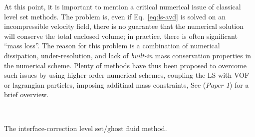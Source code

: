 At this point, it is important to mention a critical numerical issue of classical level set methods. The problem is, even if Eq.\ \eqref{eq:ls-avd} is solved on an incompressible velocity field, there is no guarantee that the numerical solution will conserve the total enclosed volume; in practice, there is often significant ``mass loss''.
The reason for this problem is a combination of numerical dissipation, under-resolution, and lack of \emph{built-in} mass conservation properties in the numerical scheme.
Plenty of methods have thus been proposed to overcome such issues by using higher-order numerical schemes, coupling the LS with VOF or lagrangian particles, imposing additinal mass constraints, \etc See \cite{ICLS} (\emph{Paper 1}) for a brief overview.

\begin{algorithm}[t]
  \\
 \caption{The interface-correction level set/ghost fluid method.}
 \label{al:ls}
\end{algorithm}

